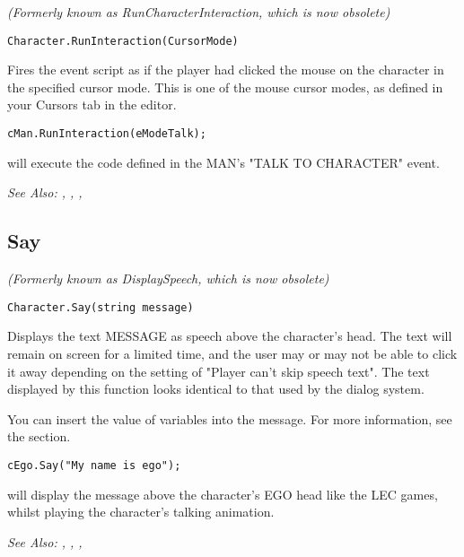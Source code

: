 \it{(Formerly known as RunCharacterInteraction, which is now obsolete)}

\begin{verbatim}
Character.RunInteraction(CursorMode)
\end{verbatim}
Fires the event script as if the player had clicked the mouse on the character
in the specified cursor mode. This is one of the mouse cursor
modes, as defined in your Cursors tab in the editor.

\begin{verbatim}
cMan.RunInteraction(eModeTalk);
\end{verbatim}
will execute the code defined in the MAN's "TALK TO CHARACTER" event.

\it{See Also:} ,
,
,


\subsection{Say}\label{Character.Say}%

\it{(Formerly known as DisplaySpeech, which is now obsolete)}

\begin{verbatim}
Character.Say(string message)
\end{verbatim}
Displays the text MESSAGE as speech above the character's head.
The text will remain on screen for a limited time, and the user may or may
not be able to click it away depending on the setting of "Player can't
skip speech text". The text displayed by this function looks identical to
that used by the dialog system.

You can insert the value of variables into the message. For more information,
see the  section.

\begin{verbatim}
cEgo.Say("My name is ego");
\end{verbatim}
will display the message above the character's EGO head like the LEC games,
whilst playing the character's talking animation.

\it{See Also:} , ,
,


